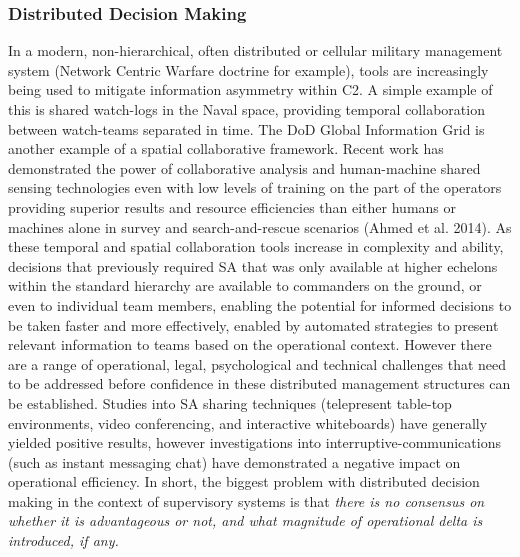 \subsubsection{Distributed Decision Making}
In a modern, non-hierarchical, often distributed or cellular military management system (Network Centric Warfare doctrine for example), tools are increasingly being used to mitigate information asymmetry within C2.
A simple example of this is shared watch-logs in the Naval space, providing temporal collaboration between watch-teams separated in time.
The DoD Global Information Grid is another example of a spatial collaborative framework.
Recent work has demonstrated the power of collaborative analysis and human-machine shared sensing technologies even with low levels of training on the part of the operators providing superior results and resource efficiencies than either humans or machines alone in survey and search-and-rescue scenarios (Ahmed et al.
2014).
As these temporal and spatial collaboration tools increase in complexity and ability, decisions that previously required SA that was only available at higher echelons within the standard hierarchy are available to commanders on the ground, or even to individual team members, enabling the potential for informed decisions to be taken faster and more effectively, enabled by automated strategies to present relevant information to teams based on the operational context.
However there are a range of operational, legal, psychological and technical challenges that need to be addressed before confidence in these distributed management structures can be established.
Studies into SA sharing techniques (telepresent table-top environments, video conferencing, and interactive whiteboards) have generally yielded positive results, however investigations into interruptive-communications (such as instant messaging chat) have demonstrated a negative impact on operational efficiency.
In short, the biggest problem with distributed decision making in the context of supervisory systems is that \textit{there is no consensus on whether it is advantageous or not, and what magnitude of operational delta is introduced, if any.}

